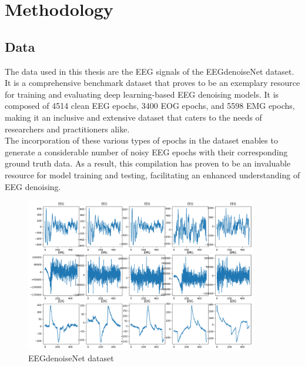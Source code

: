 \documentclass[a4paper, noexaminfo]{sapthesis}
\begin{document}
\chapter{Methodology}
\section{Data}\label{sec:data}
The data used in this thesis are the EEG signals of the EEGdenoiseNet 
dataset\cite{EEGdenoiseNet}. It is a comprehensive benchmark dataset
 that proves to be an exemplary resource for training and evaluating
  deep learning-based EEG denoising models. It is composed of 4514 clean 
  EEG epochs, 3400 EOG epochs, and 5598 EMG epochs, making it an inclusive 
  and extensive dataset that caters to the needs of researchers and
 practitioners alike.\newline \\
The incorporation of these various types of epochs in the dataset
enables to generate a considerable number of noisy EEG epochs
with their corresponding ground truth data. As a result, this compilation 
has proven to be an invaluable resource for model training and testing,
 facilitating an enhanced understanding of EEG denoising.
\begin{figure}[h!]
  \centering
  \includegraphics[width=0.9\textwidth]{images/raw_data_example.png}
  \caption{EEGdenoiseNet dataset}
  \label{fig:raw_data}
\end{figure}
\end{document}
